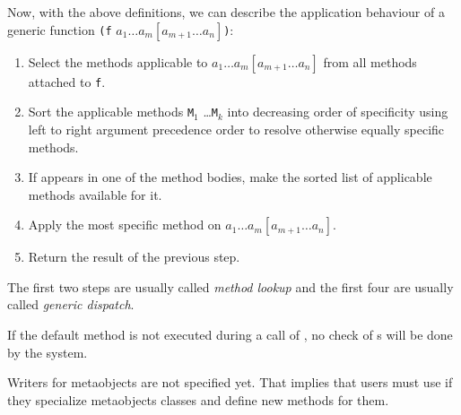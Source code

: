 \begin{optDefinition}
Now, with the above definitions, we can describe the application
behaviour of a generic function {\tt (f} $a_1 \ldots a_m [a_{m+1} \ldots
a_n]${\tt )}:

\begin{enumerate}
    \item Select the methods applicable to $a_1 \ldots a_m [a_{m+1} \ldots a_n]$
    from all methods attached to {\tt f}.

    \item Sort the applicable methods {\tt M$_{1}$} \ldots {\tt M$_{k}$} into
    decreasing order of specificity using left to right argument precedence
    order to resolve otherwise equally specific methods.

    \item If  appears in one of the method bodies,
    make the sorted list of applicable methods available for it.

    \item Apply the most specific method on $a_1 \ldots a_m [a_{m+1} \ldots
    a_n]$.

    \item Return the result of the previous step.
\end{enumerate}

The first two steps are usually called {\em method lookup} and the
first four are usually called {\em generic dispatch}.
\end{optDefinition}

\begin{optPrivate}

\end{optPrivate}
\begin{optRationale}
    If the default method is not executed during a call of
    , no check of s will be done by the
    system.

    Writers for metaobjects are not specified yet. That implies that users must
    use  if they specialize metaobjects classes and
    define new  methods for them.
\end{optRationale}

